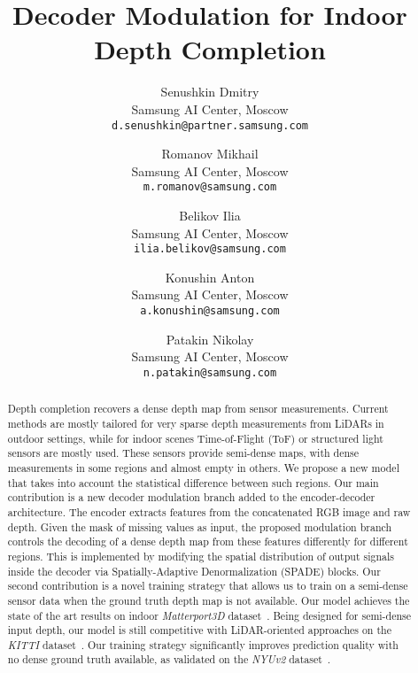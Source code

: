 \documentclass[final]{cvpr}
\begin{document}
\title{Decoder Modulation for Indoor Depth Completion}

\author{Senushkin Dmitry\\
Samsung AI Center, Moscow\\
{\tt\small d.senushkin@partner.samsung.com}
\and
Romanov Mikhail\\
Samsung AI Center, Moscow\\
{\tt\small m.romanov@samsung.com}

\and
Belikov Ilia\\
Samsung AI Center, Moscow\\
{\tt\small ilia.belikov@samsung.com}

\and
Konushin Anton\\
Samsung AI Center, Moscow\\
{\tt\small a.konushin@samsung.com}

\and
Patakin Nikolay\\
Samsung AI Center, Moscow\\
{\tt\small n.patakin@samsung.com}


}



\maketitle


\begin{abstract}
Depth completion recovers a dense depth map from sensor measurements. Current methods are mostly tailored for very sparse depth measurements from LiDARs in outdoor settings, while for indoor scenes Time-of-Flight (ToF) or structured light sensors are mostly used. These sensors provide semi-dense maps, with dense measurements in some regions and almost empty in others. We propose a new model that takes into account the statistical difference between such regions. Our main contribution is a new decoder modulation branch added to the encoder-decoder architecture. The encoder extracts features from the concatenated RGB image and raw depth. Given the mask of missing values as input, the proposed modulation branch controls the decoding of a dense depth map from these features differently for different regions. This is implemented by modifying the spatial distribution of output signals inside the decoder via Spatially-Adaptive Denormalization (SPADE) blocks. Our second contribution is a novel training strategy that allows us to train on a semi-dense sensor data when the ground truth depth map is not available. Our model achieves the state of the art results on indoor \emph{Matterport3D} dataset~\cite{Matterport3D}. Being designed for semi-dense input depth, our model is still competitive with LiDAR-oriented approaches on the \emph{KITTI} dataset~\cite{uhrig}. Our training strategy significantly improves prediction quality with no dense ground truth available, as validated on the \emph{NYUv2} dataset~\cite{nyuv2}. 

\end{abstract}
\end{document}
